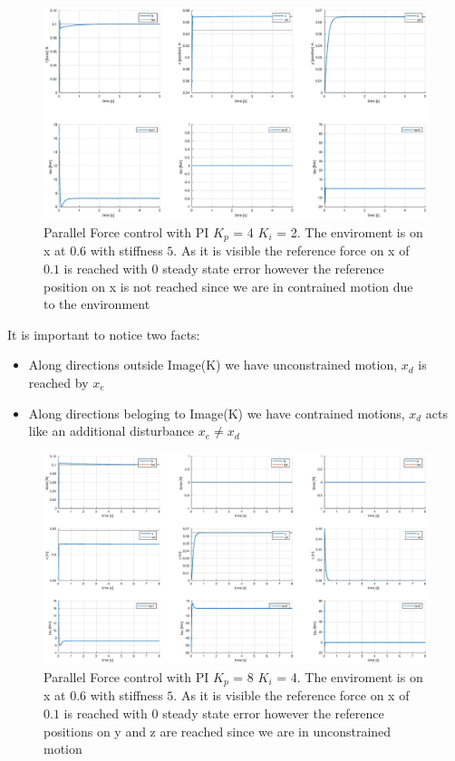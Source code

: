 \documentclass[a4paper,12pt]{article}
\begin{document}
\begin{figure}[H]
    \begin{center}
        \hspace*{-4.5cm}
        \includegraphics[scale=0.5]{images/parallel_constrained.eps}
    \end{center}
    \caption{Parallel Force control with PI $K_p$ = 4 $K_i$ = 2. The enviroment is on x at 0.6 with stiffness $5$. As it is visible the reference force on x of $0.1$ is reached with 0 steady state error however the reference position on x is not reached since we are in contrained motion due to the environment }
    \label{fig:parallel_pi}
\end{figure}

It is important to notice two facts:
\begin{itemize}
    \item Along directions outside Image(K) we have unconstrained motion, $x_d$ is reached by $x_e$
    \item Along directions beloging to Image(K) we have contrained motions, $x_d$ acts like an additional disturbance $x_e \neq x_d$
\end{itemize}
\begin{figure}[H]
    \begin{center}
        \hspace*{-4.5cm}
        \includegraphics[scale=0.5]{images/parallel_pi_complete.eps}
    \end{center}
    \caption{Parallel Force control with PI $K_p$ = 8 $K_i$ = 4. The enviroment is on x at 0.6 with stiffness $5$. As it is visible the reference force on x of $0.1$ is reached with 0 steady state error however the reference positions on y and z are reached since we are in unconstrained motion }
    \label{fig:parallel_constrained}
\end{figure}
\newpage
\end{document}
